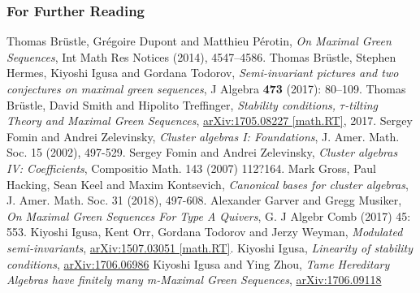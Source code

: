\documentclass{beamer}
\begin{document}
\begin{frame}[allowframebreaks]
  \frametitle<presentation>{For Further Reading}
    
  \begin{thebibliography}{10}

 
    
  \beamertemplatearticlebibitems

 Thomas Br\"ustle, Gr\'{e}goire Dupont and Matthieu P\'{e}rotin, \textit{On Maximal Green Sequences},  Int Math Res Notices (2014), 4547--4586.
 Thomas Br\"ustle, Stephen Hermes, Kiyoshi Igusa and Gordana Todorov, \textit{Semi-invariant pictures and two conjectures on maximal green sequences}, J Algebra {\bf 473} (2017): 80--109.
 Thomas Br\"ustle, David Smith and Hipolito Treffinger, \textit{Stability conditions, $\tau$-tilting Theory and Maximal Green Sequences}, \href{https://arxiv.org/abs/1705.08227}{arXiv:1705.08227 [math.RT]}, 2017.
 Sergey Fomin and Andrei Zelevinsky, \textit{Cluster algebras I: Foundations}, J. Amer. Math. Soc. 15 (2002), 497-529.
 Sergey Fomin and Andrei Zelevinsky, \textit{Cluster algebras IV: Coefficients}, Compositio Math. 143 (2007) 112?164.
 Mark Gross, Paul Hacking, Sean Keel and Maxim Kontsevich, \textit{
Canonical bases for cluster algebras}, J. Amer. Math. Soc. 31 (2018), 497-608.
 Alexander Garver and Gregg Musiker, \textit{On Maximal Green Sequences For Type A Quivers}, G. J Algebr Comb (2017) 45: 553.
 Kiyoshi Igusa, Kent Orr, Gordana Todorov and Jerzy Weyman, \textit{Modulated semi-invariants},  \href{http://arxiv.org/abs/1507.03051}{arXiv:1507.03051 [math.RT]}.
 Kiyoshi Igusa, \textit{Linearity of stability conditions}, \href{https://arxiv.org/abs/1706.06986}{arXiv:1706.06986}
 Kiyoshi Igusa and Ying Zhou, \textit{Tame Hereditary Algebras have finitely many m-Maximal Green Sequences}, \href{https://arxiv.org/abs/1706.09118}{arXiv:1706.09118}

\end{thebibliography}
\end{frame}
\end{document}
